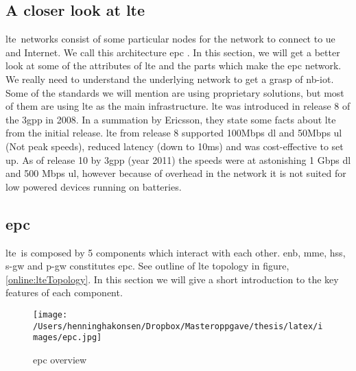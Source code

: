 \documentclass[USenglish]{ifimaster}  %
\begin{document}
\subsection{A closer look at \acrshort{lte}} \label{ssection:lte}
\acrshort{lte} networks consist of some particular nodes for the network to connect to \acrshort{ue} and Internet. We call this architecture \acrfull{epc} \cite{online:epc}. In this section, we will get a better look at some of the attributes of \acrshort{lte} and the parts which make the \acrshort{epc} network. We really need to understand the underlying network to get a grasp of \acrshort{nb-iot}. Some of the standards we will mention are using proprietary solutions, but most of them are using \acrshort{lte} as the main infrastructure. \acrshort{lte} was introduced in release 8 of the \acrshort{3gpp} in 2008. In a summation by Ericsson, they state some facts about \acrshort{lte} from the initial release. \acrshort{lte} from release 8 supported 100Mbps \acrshort{dl} and 50Mbps \acrshort{ul} (Not peak speeds), reduced latency (down to 10ms) and was cost-effective to set up\cite{online:lteIntroduction}. As of release 10 by \acrshort{3gpp} (year 2011) the speeds were at astonishing 1 Gbps \acrshort{dl} and 500 Mbps \acrshort{ul}, however because of overhead in the network it is not suited for low powered devices running on batteries.

\subsection{\acrlong{epc}}
\acrshort{lte} is composed by 5 components which interact with each other. \acrfull{enb}, \acrfull{mme}, \acrfull{hss}, \acrfull{s-gw} and \acrfull{p-gw} constitutes \acrfull{epc}. See outline of \acrshort{lte} topology in figure, \vref{online:lteTopology}. In this section we will give a short introduction to the key features of each component\cite{online:epc}.

\begin{figure}[H]
  \centering\texttt{[image: /Users/henninghakonsen/Dropbox/Masteroppgave/thesis/latex/images/epc.jpg]}
  \caption[\acrlong{epc} overview]{\acrlong{epc} overview \cite{online:lteTopology}}
  \label{online:lteTopology}
\end{figure}
\end{document}
